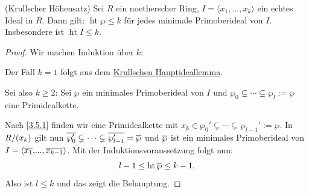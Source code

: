 \documentclass[a4paper,12pt,index=toc]{scrbook}
\theoremstyle{keinenummern} %
\newcommand{\hoehe}{\operatorname{ht}}
\renewcommand{\dotsc}{\ensuremath{\!...}}
\def\Bar#1{\ensuremath\overline{#1}}
\begin{document}
\begin{prop}\label{3.5.3}(Krullscher Höhensatz)
Sei $R$ ein noetherscher Ring, $I=\langle x_1,\dotsc,x_k\rangle$ ein echtes Ideal in $R$. Dann gilt: $\hoehe \wp\leq k$ für jedes minimale Primoberideal von $I$. Insbesondere ist $\hoehe I\leq k$.
\end{prop}
\begin{proof} Wir machen Induktion über $k$:

Der Fall $k=1$ folgt aus dem \hyperref[khil]{Krullschen Hauptideallemma}.

Sei also $k\ge 2$: Sei $\wp$ ein minimales Primoberideal von $I$ und $\wp_0\subsetneq \dotsm \subsetneq \wp_l:=\wp$ eine Primidealkette.

Nach \cref{3.5.1} finden wir eine Primidealkette mit $x_{k}\in\wp_0'\subsetneq \dotsm \subsetneq \wp_{l-1}':=\wp$. In $\Quotient{R}{(x_{k})}$ gilt nun $\Bar{\wp_0'}\subsetneq \dotsm \subsetneq \Bar{\wp_{l-1}'}=\Bar{\wp}$ und $\Bar{\wp}$ ist ein minimales Primoberideal von $I=\langle\Bar{x_1},\dotsc,\Bar{x_{k-1}}\rangle$. Mit der Induktionsvoraussetzung folgt nun: 
\begin{equation*}l-1\leq \hoehe \Bar{\wp}\leq k-1.\end{equation*}
Also ist $l\leq k$ und das zeigt die Behauptung.
\end{proof}
\end{document}

